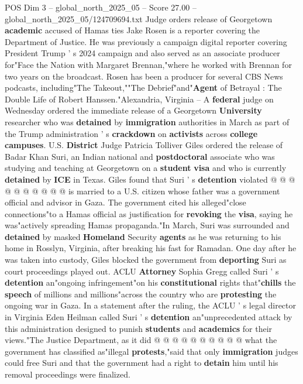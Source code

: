 \begin{textsample}{POS Dim 3 – global\_north\_2025\_05 – Score 27.00 – global\_north\_2025\_05/124709694.txt}  \label{ex:f3_pos_145}
Judge orders release of Georgetown \textbf{academic} accused of Hamas ties Jake Rosen is a reporter covering the Department of Justice.
He was previously a campaign digital reporter covering President Trump ' s 2024 campaign and also served as an associate producer for"Face the Nation with Margaret Brennan,"where he worked with Brennan for two years on the broadcast.
Rosen has been a producer for several CBS News podcasts, including"The Takeout,""The Debrief"and"\textbf{Agent} of Betrayal : The Double Life of Robert Hanssen."Alexandria, Virginia -- A \textbf{federal} judge on Wednesday ordered the immediate release of a Georgetown \textbf{University} researcher who was \textbf{detained} by \textbf{immigration} authorities in March as part of the Trump administration ' s \textbf{crackdown} on \textbf{activists} across \textbf{college} \textbf{campuses}.
U.S. \textbf{District} Judge Patricia Tolliver Giles ordered the release of Badar Khan Suri, an Indian national and \textbf{postdoctoral} associate who was studying and teaching at Georgetown on a \textbf{student} \textbf{visa} and who is currently \textbf{detained} by \textbf{ICE} in Texas.
Giles found that Suri ' s \textbf{detention} violated @ @ @ @ @ @ @ @ @ @ is married to a U.S. citizen whose father was a government official and advisor in Gaza.
The government cited his alleged"close connections"to a Hamas official as justification for \textbf{revoking} the \textbf{visa}, saying he was"actively spreading Hamas propaganda."In March, Suri was surrounded and \textbf{detained} by masked \textbf{Homeland} Security \textbf{agents} as he was returning to his home in Rosslyn, Virginia, after breaking his fast for Ramadan.
One day after he was taken into custody, Giles blocked the government from \textbf{deporting} Suri as court proceedings played out.
ACLU \textbf{Attorney} Sophia Gregg called Suri ' s \textbf{detention} an"ongoing infringement"on his \textbf{constitutional} rights that"\textbf{chills} the \textbf{speech} of millions and millions"across the country who are \textbf{protesting} the ongoing war in Gaza.
In a statement after the ruling, the ACLU ' s legal director in Virginia Eden Heilman called Suri ' s \textbf{detention} an"unprecedented attack by this administration designed to punish \textbf{students} and \textbf{academics} for their views."The Justice Department, as it did @ @ @ @ @ @ @ @ @ @ what the government has classified as"illegal \textbf{protests},"said that only \textbf{immigration} judges could free Suri and that the government had a right to \textbf{detain} him until his removal proceedings were finalized.

\end{textsample}
